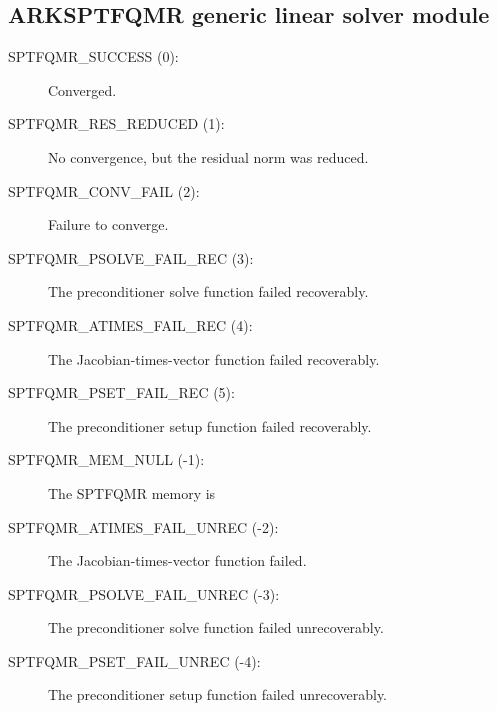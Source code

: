 \documentclass[letterpaper,10pt,english]{sphinxmanual}
\begin{document}
\subsection{ARKSPTFQMR generic linear solver module}
\label{Constants:arksptfqmr-generic-linear-solver-module}\begin{description}
\item[{SPTFQMR\_SUCCESS  (0):}] \leavevmode
Converged.

\item[{SPTFQMR\_RES\_REDUCED  (1):}] \leavevmode
No convergence, but the residual norm
was reduced.

\item[{SPTFQMR\_CONV\_FAIL  (2):}] \leavevmode
Failure to converge.

\item[{SPTFQMR\_PSOLVE\_FAIL\_REC  (3):}] \leavevmode
The preconditioner solve function
failed recoverably.

\item[{SPTFQMR\_ATIMES\_FAIL\_REC  (4):}] \leavevmode
The Jacobian-times-vector function
failed recoverably.

\item[{SPTFQMR\_PSET\_FAIL\_REC  (5):}] \leavevmode
The preconditioner setup function
failed recoverably.

\item[{SPTFQMR\_MEM\_NULL  (-1):}] \leavevmode
The SPTFQMR memory is 

\item[{SPTFQMR\_ATIMES\_FAIL\_UNREC  (-2):}] \leavevmode
The Jacobian-times-vector
function failed.

\item[{SPTFQMR\_PSOLVE\_FAIL\_UNREC  (-3):}] \leavevmode
The preconditioner solve function
failed unrecoverably.

\item[{SPTFQMR\_PSET\_FAIL\_UNREC  (-4):}] \leavevmode
The preconditioner setup function
failed unrecoverably.

\end{description}
\end{document}
